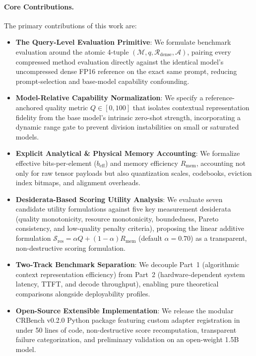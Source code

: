 \documentclass[11pt,a4paper]{article}
\begin{document}
\paragraph{Core Contributions.} The primary contributions of this work are:
\begin{itemize}[leftmargin=*]
    \item \textbf{The Query-Level Evaluation Primitive}: We formulate benchmark evaluation around the atomic 4-tuple $(\mathcal{M}, q, \mathcal{R}_{\text{dense}}, \mathcal{A})$, pairing every compressed method evaluation directly against the identical model's uncompressed dense FP16 reference on the exact same prompt, reducing prompt-selection and base-model capability confounding.
    \item \textbf{Model-Relative Capability Normalization}: We specify a reference-anchored quality metric $Q \in [0, 100]$ that isolates contextual representation fidelity from the base model's intrinsic zero-shot strength, incorporating a dynamic range gate to prevent division instabilities on small or saturated models.
    \item \textbf{Explicit Analytical \& Physical Memory Accounting}: We formalize effective bits-per-element ($b_{\text{eff}}$) and memory efficiency $R_{\text{mem}}$, accounting not only for raw tensor payloads but also quantization scales, codebooks, eviction index bitmaps, and alignment overheads.
    \item \textbf{Desiderata-Based Scoring Utility Analysis}: We evaluate seven candidate utility formulations against five key measurement desiderata (quality monotonicity, resource monotonicity, boundedness, Pareto consistency, and low-quality penalty criteria), proposing the linear additive formulation $\mathcal{S}_{\text{res}} = \alpha Q + (1 - \alpha) R_{\text{mem}}$ (default $\alpha = 0.70$) as a transparent, non-destructive scoring formulation.
    \item \textbf{Two-Track Benchmark Separation}: We decouple Part~1 (algorithmic context representation efficiency) from Part~2 (hardware-dependent system latency, TTFT, and decode throughput), enabling pure theoretical comparisons alongside deployability profiles.
    \item \textbf{Open-Source Extensible Implementation}: We release the modular CRBench v0.2.0 Python package featuring custom adapter registration in under 50 lines of code, non-destructive score recomputation, transparent failure categorization, and preliminary validation on an open-weight 1.5B model.
\end{itemize}
\end{document}
